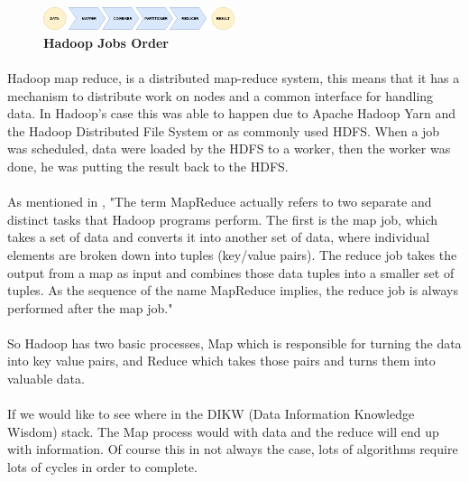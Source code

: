 \begin{figure}[h]
	\centering
	\includegraphics[width=0.5\textwidth]{images/HadoopMapReduceProcesses.png}
	\caption{\bfseries Hadoop Jobs Order}
	\label{hadoopJobsOrder}
\end{figure}

\paragraph{}Hadoop map reduce, is a distributed map-reduce system, 
this means that it has a mechanism to distribute work on nodes 
and a common interface for handling data. In Hadoop's case this was able to happen due to Apache Hadoop Yarn and the Hadoop Distributed File System or as commonly used HDFS. When a job was scheduled, data were loaded by the HDFS to a worker, 
then the worker was done, he was putting the result back to the HDFS. 

\paragraph{}As mentioned in \cite{ibmMapReduce:5}, "The term MapReduce actually refers to two separate and distinct tasks that Hadoop programs perform. The first is the map job, which takes a set of data and converts it into another set of data, where individual elements are broken down into tuples (key/value pairs). The reduce job takes the output from a map as input and combines those data tuples into a smaller set of tuples. As the sequence of the name MapReduce implies, the reduce job is always performed after the map job."

\paragraph{}So Hadoop has two basic processes, Map which is responsible for turning the data into key value pairs, and Reduce which takes those pairs and turns them into valuable data.

\paragraph{}If we would like to see where in the DIKW (Data Information Knowledge Wisdom) stack. The Map process would with data and the reduce will end up with information. Of course this in not always the case, lots of algorithms require lots of cycles in order to complete.
 
